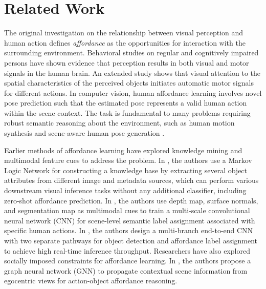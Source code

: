 \section{Related Work}
\label{sec:related_work}

The original investigation \cite{gibson1979ecological} on the relationship between visual perception and human action defines \emph{affordance} as the opportunities for interaction with the surrounding environment. Behavioral studies on regular and cognitively impaired persons have shown evidence that perception results in both visual and motor signals in the human brain. An extended study \cite{anderson2002attentional} shows that visual attention to the spatial characteristics of the perceived objects initiates automatic motor signals for different actions. In computer vision, human affordance learning involves novel pose prediction such that the estimated pose represents a valid human action within the scene context. The task is fundamental to many problems requiring robust semantic reasoning about the environment, such as human motion synthesis \cite{wang2021scene} and scene-aware human pose generation \cite{wang2017binge, roy2016multi, zhang2022inpaint, yao2023scene}.

Earlier methods of affordance learning have explored knowledge mining \cite{zhu2014reasoning} and multimodal feature cues \cite{roy2016multi} to address the problem. In \cite{zhu2014reasoning}, the authors use a Markov Logic Network for constructing a knowledge base by extracting several object attributes from different image and metadata sources, which can perform various downstream visual inference tasks without any additional classifier, including zero-shot affordance prediction. In \cite{roy2016multi}, the authors use depth map, surface normals, and segmentation map as multimodal cues to train a multi-scale convolutional neural network (CNN) for scene-level semantic label assignment associated with specific human actions. In \cite{do2018affordancenet}, the authors design a multi-branch end-to-end CNN with two separate pathways for object detection and affordance label assignment to achieve high real-time inference throughput. Researchers \cite{chuang2018learning} have also explored socially imposed constraints for affordance learning. In \cite{chuang2018learning}, the authors propose a graph neural network (GNN) to propagate contextual scene information from egocentric views for action-object affordance reasoning.

